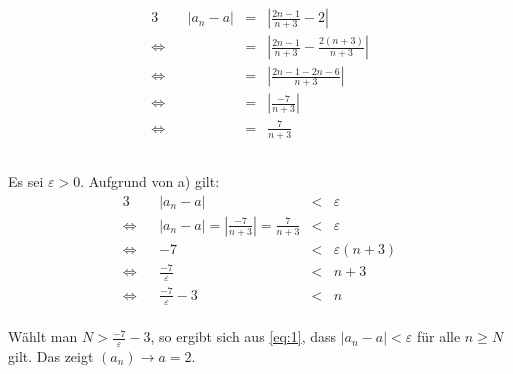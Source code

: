 \documentclass[10pt,a4paper,oneside,ngerman,numbers=noenddot]{scrartcl}
\begin{document}
\section{} %
\subsection{} %
\begin{alignat*}{3}
&& |a_{n} - a| &=& |\frac{2n-1}{n+3} - 2| \\
\Leftrightarrow && &=& |\frac{2n-1}{n+3} - \frac{2(n+3)}{n+3}| \\
\Leftrightarrow && &=& |\frac{2n-1 - 2n - 6}{n+3}| \\
\Leftrightarrow && &=& |\frac{-7}{n+3}| \\
\Leftrightarrow && &=& \frac{7}{n+3}
\end{alignat*}
\subsection{} %
Es sei $\varepsilon > 0$. Aufgrund von a) gilt:\\
\begin{alignat*}{3}
&& |a_{n} - a| &<& \varepsilon \label{eq:1}\tag{1}\\
\Leftrightarrow && |a_{n} - a| = |\frac{-7}{n+3}| = \frac{7}{n+3} &<& \varepsilon \\
\Leftrightarrow && -7 &<& \varepsilon (n+3) \\
\Leftrightarrow && \frac{-7}{\varepsilon} &<& n+3 \\
\Leftrightarrow && \frac{-7}{\varepsilon} - 3 &<& n
\end{alignat*}
\\
Wählt man $N > \frac{-7}{\varepsilon} - 3$, so ergibt sich aus \eqref{eq:1}, dass $|a_{n} - a| < \varepsilon$ für alle $n \geq N$ gilt. Das zeigt $(a_{n}) \rightarrow a = 2$.
\end{document}
